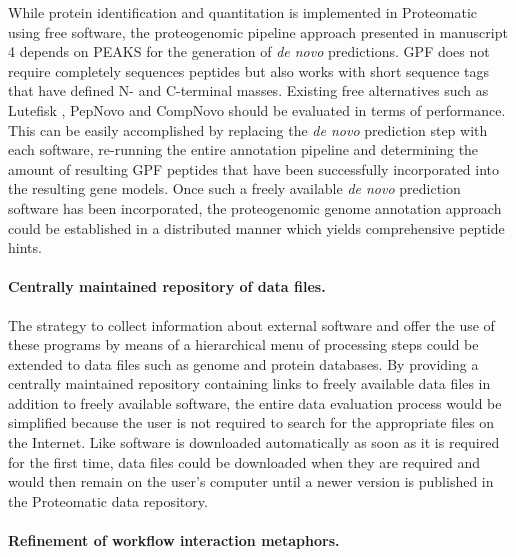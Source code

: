 While protein identification and quantitation is implemented in Proteomatic
using free software, the proteogenomic pipeline approach presented in 
manuscript 4 depends on PEAKS for the generation of {\em de novo} predictions.
GPF does not require completely sequences peptides but also works with
short sequence tags that have defined N- and C-terminal masses.
Existing free alternatives such as Lutefisk \citep{Johnson2002}, PepNovo 
\citep{Frank2005} and CompNovo \citep{Bertsch2009} should be evaluated in
terms of performance.
This can be easily accomplished by replacing the {\em de novo} prediction
step with each software, re-running the entire annotation pipeline and 
determining the amount of resulting GPF peptides that have been successfully
incorporated into the resulting gene models.
Once such a freely available {\em de novo} prediction software has been
incorporated, the proteogenomic genome annotation approach could be 
established in a distributed manner which yields comprehensive peptide hints.

\paragraph{Centrally maintained repository of data files.}

The strategy to collect information about external software and offer the
use of these programs by means of a hierarchical menu of processing steps
could be extended to data files such as genome and protein databases.
By providing a centrally maintained repository containing links to freely
available data files in addition to freely available software, the entire
data evaluation process would be simplified because the user is not
required to search for the appropriate files on the Internet.
Like software is downloaded automatically as soon as it is required for the 
first time, data files could be downloaded when they are required and would
then remain on the user's computer until a newer version is published in
the Proteomatic data repository.

\paragraph{Refinement of workflow interaction metaphors.}

